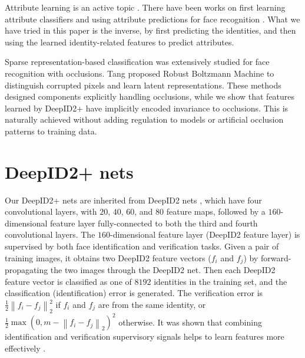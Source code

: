 \documentclass[10pt,twocolumn,letterpaper]{article}
\begin{document}
Attribute learning  is  an active  topic \cite{farhadi2009,berg2010,parikh2011,bourdev2011,luo2013,zhang2014}. There have been works on first learning attribute classifiers and using attribute predictions for face recognition \cite{kumar2009,chung2012}. What we have tried in this paper is the inverse, by first predicting the identities, and then using the learned identity-related features to predict attributes.

Sparse representation-based classification \cite{wright2009, yang2010,liu2010,zhang2011a,elhamifar2011,jia2012} was extensively studied for face recognition with occlusions. Tang \etal \cite{tang2012} proposed Robust Boltzmann Machine to distinguish corrupted pixels and learn latent representations. These  methods designed components explicitly handling occlusions, while we show that features learned by DeepID2+ have implicitly encoded  invariance to occlusions. This is naturally achieved without adding regulation to  models or artificial occlusion patterns to  training data.


\section{DeepID2+ nets}

Our DeepID2+ nets are inherited from DeepID2 nets \cite{sun2014b}, which have four convolutional layers, with $20$, $40$, $60$, and $80$  feature maps, followed by a $160$-dimensional feature layer fully-connected to both the third and fourth convolutional layers. The $160$-dimensional feature layer (DeepID2 feature layer) is supervised by both face identification and verification tasks. Given a pair of training  images, it  obtains two DeepID2 feature vectors ($f_i$ and $f_j$) by forward-propagating the two images through the DeepID2 net. Then each DeepID2 feature vector is classified as one of $8192$ identities in the training set, and the classification (identification) error is generated. The verification error is $\frac{1}{2}\left\|f_i-f_j\right\|_2^2$ if $f_i$ and $f_j$ are from the same identity, or $\frac{1}{2}\max\left(0, m - \left\|f_i-f_j\right\|_2\right)^2$ otherwise. It was shown that combining identification and verification supervisory signals helps to learn features more effectively \cite{sun2014b}.
\end{document}
